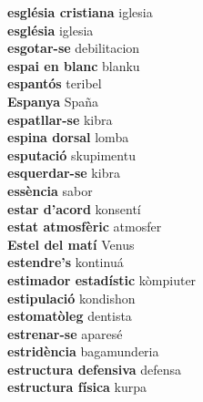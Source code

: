 \textbf{ església cristiana  } iglesia \\
\textbf{ església  } iglesia \\
\textbf{ esgotar-se  } debilitacion \\
\textbf{ espai en blanc  } blanku \\
\textbf{ espantós  } teribel \\
\textbf{ Espanya  } Spaña \\
\textbf{ espatllar-se  } kibra \\
\textbf{ espina dorsal  } lomba \\
\textbf{ esputació  } skupimentu \\
\textbf{ esquerdar-se  } kibra \\
\textbf{ essència  } sabor \\
\textbf{ estar d’acord  } konsentí \\
\textbf{ estat atmosfèric  } atmosfer \\
\textbf{ Estel del matí  } Venus \\
\textbf{ estendre’s  } kontinuá \\
\textbf{ estimador estadístic  } kòmpiuter \\
\textbf{ estipulació  } kondishon \\
\textbf{ estomatòleg  } dentista \\
\textbf{ estrenar-se  } aparesé \\
\textbf{ estridència  } bagamunderia \\
\textbf{ estructura defensiva  } defensa \\
\textbf{ estructura física  } kurpa \\
